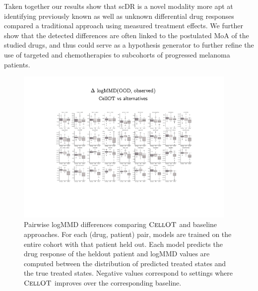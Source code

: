 Taken together our results show that scDR is a novel modality more apt at identifying previously known as well as unknown differential drug responses compared a traditional approach using measured treatment effects.
 We further show that the detected differences are often linked to the postulated MoA of the studied drugs, and thus could serve as a hypothesis generator to further refine the use of targeted and chemotherapies to subcohorts of progressed melanoma patients.  

\begin{figure}[h]
  \begin{center}
    \includegraphics[width=0.95\textwidth]{figures/cellot-cohort/ood-eval-logmmd.pdf}
  \end{center}
  \caption{
    Pairwise logMMD differences comparing $\textsc{CellOT}$ and baseline approaches.
    For each (drug, patient) pair, models are trained on the entire cohort with that patient held out.
    Each model predicts the drug response of the heldout patient
    and logMMD values are computed between the distribution of predicted treated states and the true treated states.
    Negative values correspond to settings where $\textsc{CellOT}$ improves over the corresponding baseline.
  }
\label{fig:ood-eval-logmmd}
\end{figure}

